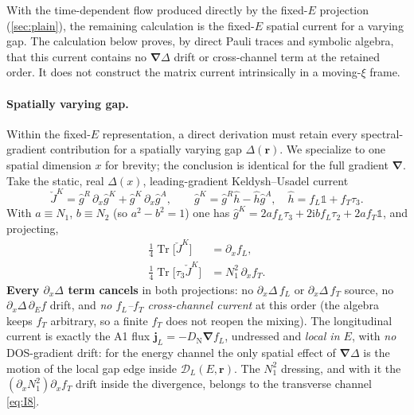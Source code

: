 \documentclass[
  aps,
  prb,
  preprint,
  superscriptaddress,
  longbibliography,
  nofootinbib
]{revtex4-2}
\newcommand{\ii}{\mathrm{i}}
\newcommand{\Tr}{\operatorname{Tr}}
\newcommand{\br}{\mathbf{r}}
\newcommand{\bnabla}{\boldsymbol{\nabla}}
\newcommand{\DOS}{N_1}
\newcommand{\DN}{D_{\mathrm{N}}}
\newcommand{\fL}{f_L}
\newcommand{\fT}{f_T}
\newcommand{\hatg}{\hat{g}}
\providecommand{\openone}{}\renewcommand{\openone}{\mathds{1}}
\begin{document}
With the time-dependent flow produced directly by the fixed-$E$ projection
(\cref{sec:plain}), the remaining calculation is the fixed-$E$ spatial
current for a varying gap. The calculation below proves, by direct Pauli
traces and symbolic algebra, that this current contains no
$\bnabla\Delta$ drift or cross-channel term at the retained order. It does
not construct the matrix current intrinsically in a moving-$\xi$ frame.

\paragraph{Spatially varying gap.} Within the fixed-$E$ representation, a
direct derivation must retain every spectral-gradient contribution for a
spatially varying gap $\Delta(\br)$. We specialize to one spatial dimension
$x$ for brevity; the conclusion is identical for the full gradient
$\bnabla$. Take the static, real $\Delta(x)$, leading-gradient
Keldysh--Usadel current
\begin{equation}
  \check J^{K}=\hatg^{R}\,\partial_x\hatg^{K}+\hatg^{K}\,\partial_x\hatg^{A},
  \qquad
  \hatg^{K}=\hatg^{R}\hat h-\hat h\hatg^{A},\quad
  \hat h=\fL\openone+\fT\tau_3 .
\end{equation}
With $a\equiv\DOS$, $b\equiv N_2$ (so $a^2-b^2=1$) one has
$\hatg^{K}=2a\fL\tau_3+2\ii b\fL\tau_2+2a\fT\openone$, and projecting,
\begin{align}
  \tfrac14\Tr\!\big[\check J^{K}\big]       &= \partial_x\fL,
  \label{eq:I7}\\
  \tfrac14\Tr\!\big[\tau_3\check J^{K}\big] &= \DOS^{2}\,\partial_x\fT .
  \label{eq:I8}
\end{align}
\textbf{Every $\partial_x\Delta$ term cancels} in both projections: no
$\partial_x\Delta\,\fL$ or $\partial_x\Delta\,\fT$ source, no
$\partial_x\Delta\,\partial_E f$ drift, and \emph{no $\fL$--$\fT$ cross-channel
current} at this order (the algebra keeps $\fT$ arbitrary, so a finite $\fT$ does
not reopen the mixing). The longitudinal current is exactly the A1
flux $\mathbf j_L=-\DN\bnabla\fL$, undressed and \emph{local in $E$}, with
\emph{no} DOS-gradient drift: for the energy channel the only spatial effect
of $\bnabla\Delta$ is the motion of the local gap edge inside
$\mathcal D_L(E,\br)$. The $\DOS^2$ dressing, and with it the
$(\partial_x\DOS^2)\partial_x\fT$ drift inside the divergence, belongs to
the transverse channel \cref{eq:I8}.
\end{document}
